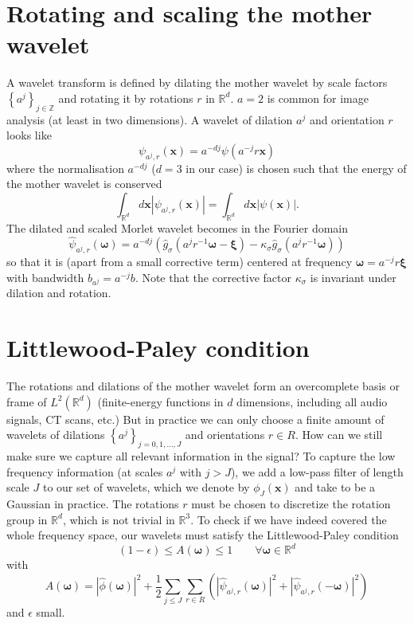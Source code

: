 \documentclass[twocolumn, openany, twoside, article]{memoir}
\begin{document}
\section{Rotating and scaling the mother wavelet}
A wavelet transform is defined by dilating the mother wavelet by scale factors $\left\{ a^j \right\}_{j \in \mathbb{Z}}$
and rotating it by rotations $r$ in $\mathbb{R}^d$. $a = 2$ is common for image analysis (at least in two dimensions).
A wavelet of dilation $a^j$ and orientation $r$ looks like
\begin{equation}
  \psi_{a^j, r}(\bm{x}) = a^{-dj} \psi(a^{-j}r\bm{x})
\end{equation}
where the normalisation $a^{-dj}$ ($d = 3$ in our case) is chosen such that the energy of the mother wavelet is conserved
\begin{equation}
  \int_{\mathbb{R}^d} d\bm{x} | \psi_{a^j, r}(\bm{x}) | = \int_{\mathbb{R}^d} d\bm{x} | \psi(\bm{x}) |.
\end{equation}
The dilated and scaled Morlet wavelet becomes in the Fourier domain
\begin{equation}
  \hat{\psi}_{a^j, r}(\bm{\omega}) = a^{-dj} \left( \hat{g}_{\sigma}(a^j r^{-1} \bm{\omega} - \bm{\xi}) - \kappa_{\sigma}\hat{g}_{\sigma}(a^j r^{-1} \bm{\omega}) \right)
\end{equation}
so that it is (apart from a small corrective term) centered at frequency $\bm{\omega} = a^{-j}r\bm{\xi}$
with bandwidth $b_{a^j} = a^{-j}b$. Note that the corrective factor $\kappa_{\sigma}$ is invariant under dilation and rotation.


\section{Littlewood-Paley condition}

The rotations and dilations of the mother wavelet form an overcomplete basis or frame of $L^2(\mathbb{R}^d)$
(finite-energy functions in $d$ dimensions, including all audio signals, CT scans, etc.) But in practice we can only
choose a finite amount of wavelets of dilations $\left\{ a^j \right\}_{j = 0, 1, \dots, J}$ and orientations $r \in R$.
How can we still make sure we capture all relevant information in the signal?
To capture the low frequency information (at scales $a^j$ with $j > J$), we add a low-pass filter of
length scale $J$ to our set of wavelets, which we denote by $\phi_J(\bm{x})$ and take to be a Gaussian in practice.
The rotations $r$ must be chosen to discretize the rotation group in $\mathbb{R}^d$, which is not trivial in $\mathbb{R}^3$.
To check if we have indeed covered the whole frequency space, our wavelets must satisfy the Littlewood-Paley condition
\begin{equation}
  (1 - \epsilon) \leq A(\bm{\omega}) \leq 1 \qquad \forall \bm{\omega} \in \mathbb{R}^d
\end{equation}
with
\begin{equation}
  A(\bm{\omega}) = \left| \hat{\phi}(\bm{\omega}) \right|^2 + \frac{1}{2} \sum_{j \leq J} \sum_{r \in R}
  \left( \left| \hat{\psi}_{a^j, r}(\bm{\omega}) \right|^2 + \left| \hat{\psi}_{a^j, r}(\bm{-\omega}) \right|^2 \right)
\end{equation}
and $\epsilon$ small.
\end{document}

